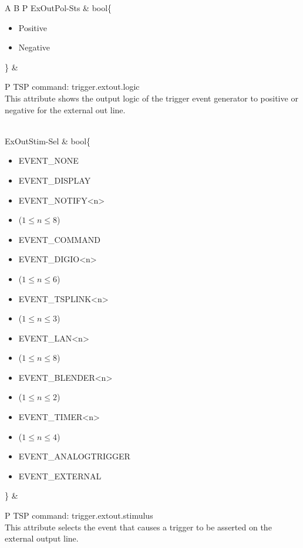 \documentclass[openany]{article}
\begin{document}
\begin{longtable}{A B P}
		ExOutPol-Sts & bool\{\begin{itemize}[noitemsep]
					\small
					\item[] Positive
					\item[] Negative
				\end{itemize}\} & 
				\begin{tabular}{P}
					TSP command: trigger.extout.logic \\
					This attribute shows the output logic of the trigger event generator to positive or negative for the external out line.
				\end{tabular} \\ \hline
		ExOutStim-Sel & bool\{\begin{itemize}[noitemsep]
					\small
					\item[] EVENT\_NONE
					\item[] EVENT\_DISPLAY
					\item[] EVENT\_NOTIFY\textless n\textgreater
					\item[] ($1\leq n\leq 8$)
					\item[] EVENT\_COMMAND
					\item[] EVENT\_DIGIO\textless n\textgreater
					\item[] ($1\leq n\leq 6$)
					\item[] EVENT\_TSPLINK\textless n\textgreater
					\item[] ($1\leq n\leq 3$)
					\item[] EVENT\_LAN\textless n\textgreater
					\item[] ($1\leq n\leq 8$)
					\item[] EVENT\_BLENDER\textless n\textgreater 
					\item[] ($1\leq n\leq 2$)
					\item[] EVENT\_TIMER\textless n\textgreater
					\item[] ($1\leq n\leq 4$)
					\item[] EVENT\_ANALOGTRIGGER
					\item[] EVENT\_EXTERNAL
				\end{itemize}\} & 
				\begin{tabular}{P}
					TSP command: trigger.extout.stimulus \\
					This attribute selects the event that causes a trigger to be asserted on the external output line.
				\end{tabular} \\


\end{longtable}
\end{document}
